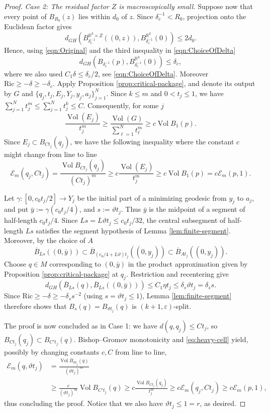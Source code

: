 \documentclass[11pt]{amsart}
\theoremstyle{definition}
\theoremstyle{remark}
\DeclareMathOperator{\Vol}{Vol}
\newcommand{\Ex}{\mathcal E}
\begin{document}
\begin{proof}
\smallskip
\noindent
\emph{Case 2: The residual factor $Z$ is macroscopically small.}
Suppose now that every point of $B_{R_0}(z)$ lies within $d_0$ of
$z$. Since $\delta_c^{-1}<R_0$, projection onto the Euclidean factor
gives
\[
 d_{GH}\!\left(
 B_{\delta_c^{-1}}^{\mathbb R^k\times Z}((0,z)),
 B_{\delta_c^{-1}}^{\mathbb R^k}(0)\right)\leq2d_0.
\]
Hence, using \eqref{eqn:Original} and the third inequality in \eqref{eqn:ChoiceOfDelta}
\[
 d_{GH}\!\left(
 B_{\delta_c^{-1}}(p),
 B_{\delta_c^{-1}}^{\mathbb R^k}(0)\right)\leq\delta_c,
\]
where we also used $C_1\delta\leq \delta_c/2$, see \eqref{eqn:ChoiceOfDelta}. Moreover $\mathrm{Ric}\geq - \delta\geq -\delta_c$. 
Apply Proposition \ref{prop:critical-package}, and denote its output
by $G$ and $\{q_j,t_j,E_j,Y_j,y_j,a_j\}_{j=1}^N$.
Since $k\leq m$ and $0<t_j\leq1$, we have $
                    \sum_{j=1}^N t_j^m
                    \leq\sum_{j=1}^N t_j^k\leq C$. 
Consequently, for some $j$
\[
 \frac{\Vol(E_j)}{t_j^m}
 \geq\frac{\Vol(G)}{\sum_{\ell=1}^N t_\ell^m}
 \geq c\Vol B_1(p).
\]
Since $E_j\subset B_{Ct_j}(q_j)$, we have the following inequality where the constant $c$ might change from line to line
\begin{equation}\label{eq:heavy-cell}
 \Ex_m(q_j,Ct_j)
 =\frac{\Vol B_{Ct_j}(q_j)}{(Ct_j)^m}
 \geq c\frac{\Vol(E_j)}{t_j^m}
 \geq c\Vol B_1(p)=c\Ex_m(p,1).
\end{equation}

Let $\gamma:[0,c_0t_j/2]\to Y_j$ be the initial part of a minimizing
geodesic from $y_j$ to $a_j$, and put $
                       \bar y:=\gamma(c_0t_j/4)$, and $s:=\vartheta t_j$.
Thus $\bar y$ is the midpoint of a segment of half-length $c_0t_j/4$.
Since $Ls=L\vartheta t_j\leq c_0t_j/32$, the central subsegment of
half-length $Ls$ satisfies the segment hypothesis of
Lemma \ref{lem:finite-segment}.  Moreover, by the choice of $A$
\[
 \overline B_{Ls}((0,\bar y))
 \subset
 \overline B_{(c_0/4+L\vartheta)t_j}((0,y_j))
 \subset \overline{B}_{At_j}((0,y_j)).
\]
Choose $q\in M$ corresponding to $(0,\bar y)$ in the product
approximation given by Proposition \ref{prop:critical-package} at $q_j$.  Restriction and recentering give
\[
 d_{GH}\!\left(
 \overline B_{Ls}(q),
 \overline B_{Ls}((0,\bar y))
 \right)
 \leq C_1\eta t_j
 \leq\delta_s\vartheta t_j=\delta_ss.
\]
Since $\mathrm{Ric}\geq - \delta\geq -\delta_ss^{-2}$ (using $s=\vartheta t_j\leq 1$), Lemma \ref{lem:finite-segment} therefore shows that
$B_s(q)=B_{\vartheta t_j}(q)$ is $(k+1,\varepsilon)$-split.

The proof is now concluded as in Case 1: we have $d(q,q_j)\leq Ct_j$, so
$B_{Ct_j}(q_j)\subset B_{C't_j}(q)$. Bishop--Gromov monotonicity and
\eqref{eq:heavy-cell} yield, possibly by changing constants $c,C$ from line to line,
\[
 \begin{split}
 \Ex_m(q,\vartheta t_j)
 &=
   \frac{\Vol B_{\vartheta t_j}(q)}{(\vartheta t_j)^m}\\
 &\geq
   \frac{c}{(\vartheta t_j)^m}
   \Vol B_{C't_j}(q)\geq c\frac{\Vol B_{Ct_j}(q_j)}{t_j^m}
 \geq c\Ex_m(q_j,Ct_j)
 \geq c\Ex_m(p,1),
 \end{split}
\]
thus concluding the proof. Notice that we also have $\vartheta t_j\leq 1=r$, as desired.
\end{proof}
\end{document}
